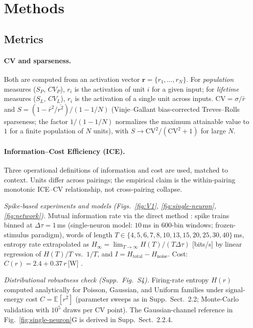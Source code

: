 \section{Methods}

\subsection{Metrics}
\label{measures}

\paragraph{CV and sparseness.}
Both are computed from an activation vector $\mathbf{r}=\{r_1,\dots,r_N\}$.  For \emph{population} measures ($S_P$, $CV_P$), $r_i$ is the activation of unit $i$ for a given input; for \emph{lifetime} measures ($S_L$, $CV_L$), $r_i$ is the activation of a single unit across inputs.  $\mathrm{CV} = \sigma/\bar{r}$ and $S = (1-\bar{r}^2/\overline{r^2})/(1-1/N)$ (Vinje--Gallant bias-corrected Treves--Rolls sparseness; the factor $1/(1-1/N)$ normalizes the maximum attainable value to $1$ for a finite population of $N$ units), with $S \to \mathrm{CV}^2/(\mathrm{CV}^2+1)$ for large $N$.

\paragraph{Information--Cost Efficiency (ICE).}
Three operational definitions of information and cost are used, matched to context.  Units differ across pairings; the empirical claim is the within-pairing monotonic ICE--CV relationship, not cross-pairing collapse.

\emph{Spike-based experiments and models (Figs.~\ref{fig:V1}, \ref{fig:single-neuron}, \ref{fig:network}).}  Mutual information rate via the direct method \cite{97bialek}: spike trains binned at $\Delta\tau=1$\,ms (single-neuron model: $10$\,ms in 600-bin windows; frozen-stimulus paradigm), words of length $T\in\{4,5,6,7,8,10,13,15,20,25,30,40\}$\,ms, entropy rate extrapolated as $H_\infty=\lim_{T\to\infty}H(T)/(T\Delta\tau)$ [bits/s] by linear regression of $H(T)/T$ vs.\ $1/T$, and $I=H_{\mathrm{total}}-H_{\mathrm{noise}}$.  Cost: $C(r) = 2.4 + 0.37\,r$\,[W] \cite{Yuguo2018Evaluating}.

\emph{Distributional robustness check (Supp.~Fig.~S4).}  Firing-rate entropy $H(r)$ computed analytically for Poisson, Gaussian, and Uniform families under signal-energy cost $C=\mathbb{E}[r^2]$ (parameter sweeps as in Supp.~Sect.~2.2; Monte-Carlo validation with $10^5$ draws per CV point).  The Gaussian-channel reference in Fig.~\ref{fig:single-neuron}G is derived in Supp.~Sect.~2.2.4.


